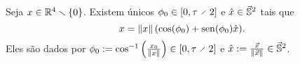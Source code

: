 \begin{proposition}
Seja $x \in \R^4 \setminus \{0\}$. Existem únicos $\phi_0 \in \intff{0}{\tau \div 2}$ e $\hat{x} \in \vec{\S}^2$ tais que
	\begin{equation*}
	x = \nor{x}(\cos(\phi_0) + \sin(\phi_0) \hat{x}).
	\end{equation*}
Eles são dados por $\phi_0 := \cos\inv\left( \frac{\esc{x}}{\nor{x}} \right) \in \intff{0}{\tau \div 2}$ e $\hat{x} := \frac{\vec{x}}{\nor{\vec{x}}} \in \vec{\S}^2$.
\end{proposition}
